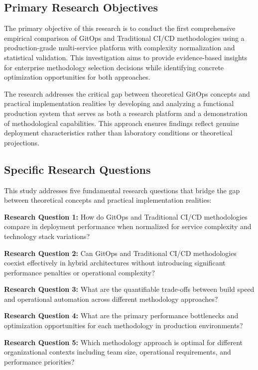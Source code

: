 \subsection{Primary Research Objectives}
The primary objective of this research is to conduct the first comprehensive empirical comparison of GitOps and Traditional CI/CD methodologies using a production-grade multi-service platform with complexity normalization and statistical validation. This investigation aims to provide evidence-based insights for enterprise methodology selection decisions while identifying concrete optimization opportunities for both approaches.

The research addresses the critical gap between theoretical GitOps concepts and practical implementation realities by developing and analyzing a functional production system that serves as both a research platform and a demonstration of methodological capabilities. This approach ensures findings reflect genuine deployment characteristics rather than laboratory conditions or theoretical projections.

\subsection{Specific Research Questions}
This study addresses five fundamental research questions that bridge the gap between theoretical concepts and practical implementation realities:

\textbf{Research Question 1:} How do GitOps and Traditional CI/CD methodologies compare in deployment performance when normalized for service complexity and technology stack variations?

\textbf{Research Question 2:} Can GitOps and Traditional CI/CD methodologies coexist effectively in hybrid architectures without introducing significant performance penalties or operational complexity?

\textbf{Research Question 3:} What are the quantifiable trade-offs between build speed and operational automation across different methodology approaches?

\textbf{Research Question 4:} What are the primary performance bottlenecks and optimization opportunities for each methodology in production environments?

\textbf{Research Question 5:} Which methodology approach is optimal for different organizational contexts including team size, operational requirements, and performance priorities?


